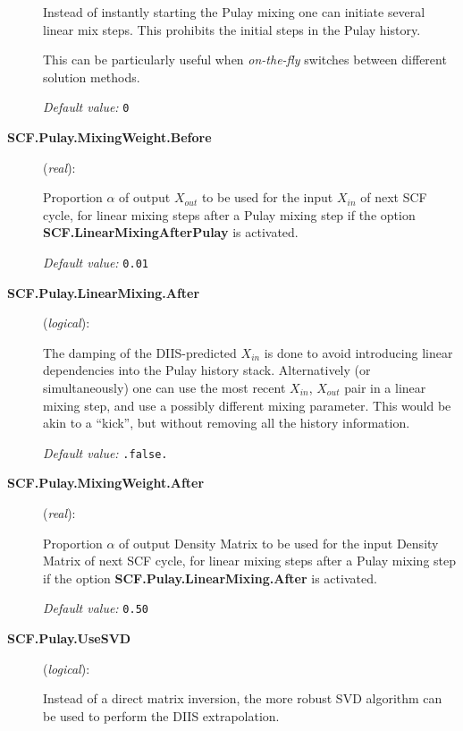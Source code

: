 \begin{description}
Instead of instantly starting the Pulay mixing one can initiate several
linear mix steps. This prohibits the initial steps in the Pulay history.

This can be particularly useful when \emph{on-the-fly} switches between different solution
methods.

\textit{Default value:} \texttt{0}

\item[\textbf{SCF.Pulay.MixingWeight.Before}] (\textit{real}):

Proportion $\alpha$ of output $X_{out}$ to be used for the input
$X_{in}$ of next SCF cycle, for linear mixing steps after a Pulay
mixing step if the option \textbf{SCF.LinearMixingAfterPulay} is
activated.

\textit{Default value:} \texttt{0.01}

\item[\textbf{SCF.Pulay.LinearMixing.After}] (\textit{logical}):

The damping of the DIIS-predicted $X_{in}$ is done to avoid introducing
linear dependencies into the Pulay history stack. Alternatively (or
simultaneously) one can use the most recent $X_{in}$, $X_{out}$ pair in a
linear mixing step, and use a possibly different mixing
parameter. This would be akin to a ``kick'', but without removing all
the history information.

\textit{Default value:} \texttt{.false.}

\item[\textbf{SCF.Pulay.MixingWeight.After}] (\textit{real}):

Proportion $\alpha$ of output Density Matrix to be used for the input
Density Matrix of next SCF cycle, for linear mixing
steps after a Pulay mixing step if the option \textbf{SCF.Pulay.LinearMixing.After} is activated.

\textit{Default value:} \texttt{0.50}

\item[\textbf{SCF.Pulay.UseSVD}] (\textit{logical}):

Instead of a direct matrix inversion, the more robust SVD algorithm can
be used to perform the DIIS extrapolation.


\end{description}
